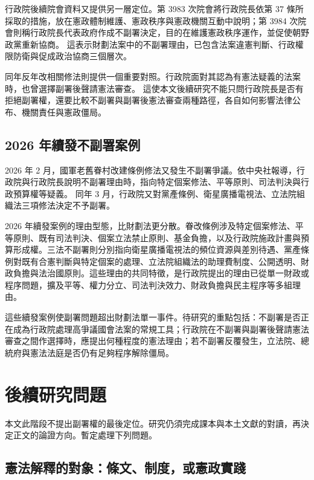\documentclass[12pt]{ctexart}
\begin{document}
行政院後續院會資料又提供另一層定位。第 3983 次院會將行政院長依第 37 條所採取的措施，放在憲政體制維護、憲政秩序與憲政機關互動中說明；第 3984 次院會則稱行政院長代表政府作成不副署決定，目的在維護憲政秩序運作，並促使朝野政黨重新協商。\autocite{ey_meeting_153_dataset} 這表示財劃法案中的不副署理由，已包含法案違憲判斷、行政權限防衛與促成政治協商三個層次。

同年反年改相關修法則提供一個重要對照。行政院面對其認為有憲法疑義的法案時，也曾選擇副署後聲請憲法審查。\autocite{ey_pension_review_2025} 這使本文後續研究不能只問行政院長是否有拒絕副署權，還要比較不副署與副署後憲法審查兩種路徑，各自如何影響法律公布、機關責任與憲政僵局。

\subsection{2026 年續發不副署案例}

2026 年 2 月，國軍老舊眷村改建條例修法又發生不副署爭議。依中央社報導，行政院與行政院長說明不副署理由時，指向特定個案修法、平等原則、司法判決與行政預算權等疑義。\autocites{cna_village_2026_1}{cna_village_2026_2} 同年 3 月，行政院又對黨產條例、衛星廣播電視法、立法院組織法三項修法決定不予副署。\autocite{cna_three_bills_2026}

2026 年續發案例的理由型態，比財劃法更分散。眷改條例涉及特定個案修法、平等原則、既有司法判決、個案立法禁止原則、基金負擔，以及行政院施政計畫與預算形成權。三法不副署則分別指向衛星廣播電視法的頻位資源與差別待遇、黨產條例對既有合憲判斷與特定個案的處理、立法院組織法的助理費制度、公開透明、財政負擔與法治國原則。這些理由的共同特徵，是行政院提出的理由已從單一財政或程序問題，擴及平等、權力分立、司法判決效力、財政負擔與民主程序等多組理由。

這些續發案例使副署問題超出財劃法單一事件。待研究的重點包括：不副署是否正在成為行政院處理高爭議國會法案的常規工具；行政院在不副署與副署後聲請憲法審查之間作選擇時，應提出何種程度的憲法理由；若不副署反覆發生，立法院、總統府與憲法法庭是否仍有足夠程序解除僵局。

\section{後續研究問題}

本文此階段不提出副署權的最後定位。研究仍須完成課本與本土文獻的對讀，再決定正文的論證方向。暫定處理下列問題。

\subsection{憲法解釋的對象：條文、制度，或憲政實踐}
\end{document}
